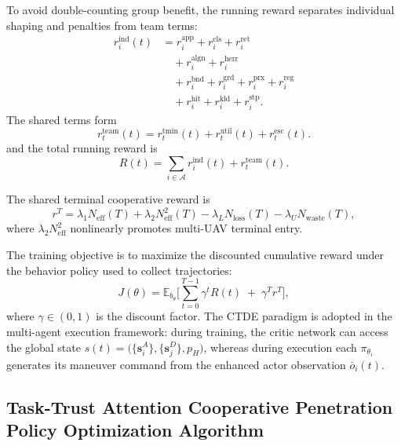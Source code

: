 \documentclass{cja}
\begin{document}
To avoid double-counting group benefit, the running reward separates individual shaping and penalties from team terms:
\begin{equation}
\begin{aligned}
r_i^{\mathrm{ind}}(t)
&=
{r_i^{\mathrm{app}}+r_i^{\mathrm{cls}}+r_i^{\mathrm{ret}}}\\
&\quad
+{r_i^{\mathrm{algn}}+r_i^{\mathrm{herr}}}\\
&\quad
+{r_i^{\mathrm{bnd}}+r_i^{\mathrm{grd}}+r_i^{\mathrm{prx}}+r_i^{\mathrm{reg}}}\\
&\quad
+r_i^{\mathrm{hit}}+r_i^{\mathrm{kld}}+r_i^{\mathrm{stp}}.
\end{aligned}
\label{eq:r-ind}
\end{equation}
The shared terms form
\begin{equation}
r_t^{\mathrm{team}}(t)
=
r_t^{\mathrm{tmin}}(t)
+
r_t^{\mathrm{util}}(t)
+
r_t^{\mathrm{esc}}(t).
\end{equation}
and the total running reward is
\begin{equation}
R(t)=\sum_{i\in\mathcal{A}}r_i^{\mathrm{ind}}(t)+r_t^{\mathrm{team}}(t).
\label{eq:r-total}
\end{equation}

The shared terminal cooperative reward is
\begin{equation}
r^{T}=\lambda_1 N_{\mathrm{eff}}(T)+\lambda_2 N_{\mathrm{eff}}^{2}(T)
-\lambda_L N_{\mathrm{loss}}(T)-\lambda_U N_{\mathrm{waste}}(T),
\label{eq:r-term}
\end{equation}
where $\lambda_2 N_{\mathrm{eff}}^{2}$ nonlinearly promotes multi-UAV terminal entry.

The training objective is to maximize the discounted cumulative reward under the behavior policy used to collect trajectories:
\begin{equation}
J(\theta)=\mathbb{E}_{b_\theta}\Biggl[\sum_{t=0}^{T-1}\gamma^{t} R(t)\;+\;\gamma^{T} r^{T}\Biggr],
\label{eq:rl-objective}
\end{equation}
where $\gamma\in(0,1)$ is the discount factor. The CTDE paradigm is adopted in the multi-agent execution framework: during training, the critic network can access the global state $s(t)=\bigl(\{\mathbf s_i^A\},\{\mathbf s_j^D\},p_H\bigr)$, whereas during execution each $\pi_{\theta_i}$ generates its maneuver command from the enhanced actor observation $\bar o_i(t)$.

\subsection{Task-Trust Attention Cooperative Penetration Policy Optimization Algorithm}
\label{subsubsec:rta-mappo}
\end{document}
